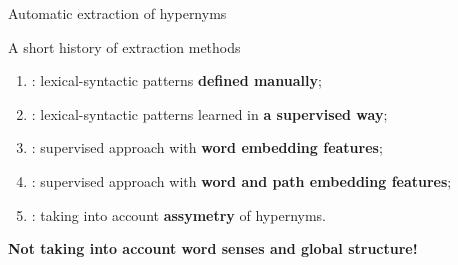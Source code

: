 \documentclass[usenames,dvipsnames]{beamer}
\begin{document}
\begin{frame}{Automatic extraction of hypernyms}

\vspace{-10pt}
\begin{block}{A short history of extraction methods}
\begin{enumerate}
	\item \cite{hearst1992automatic}: lexical-syntactic patterns \textbf{\alert{defined manually}};

	\pause 
		
	\item \cite{snow2004learning}: lexical-syntactic patterns learned in \textbf{\alert{a supervised way}};
	
	\pause 
	
	\item \cite{weeds2014learning}: supervised approach with \textbf{\alert{word embedding features}};
	
	\item \cite{shwartz-goldberg-dagan:2016:P16-1}: supervised approach with \textbf{\alert{word and path embedding features}};
	
	\item \cite{glavavs-ponzetto:2017:EMNLP2017,ustalov-EtAl:2017:EACLshort}: taking into account \textbf{\alert{assymetry}} of hypernyms.

\end{enumerate}
\end{block}

\pause 

\textbf{Not taking into account \alert{word senses} and \alert{global structure}!}

 
\end{frame}
\end{document}
